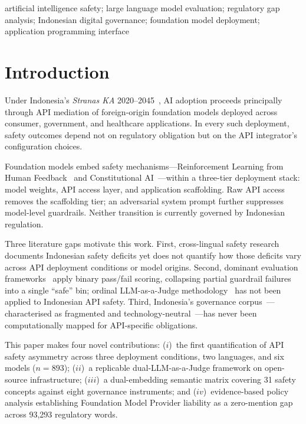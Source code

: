 \documentclass[conference]{IEEEtran}
\begin{document}
\begin{IEEEkeywords}
artificial intelligence safety; large language model evaluation; regulatory gap
analysis; Indonesian digital governance; foundation model deployment; application
programming interface
\end{IEEEkeywords}

\section{Introduction}

Under Indonesia’s \textit{Stranas KA} 2020--2045~\cite{b9}, AI adoption proceeds principally through API mediation of foreign-origin foundation models deployed across consumer, government, and healthcare applications. In every such deployment, safety outcomes depend not on regulatory obligation but on the API integrator’s configuration choices.

Foundation models embed safety mechanisms—Reinforcement Learning from Human Feedback~\cite{b25} and Constitutional AI~\cite{b26}—within a three-tier deployment stack: model weights, API access layer, and application scaffolding. Raw API access removes the scaffolding tier; an adversarial system prompt further suppresses model-level guardrails. Neither transition is currently governed by Indonesian regulation.

Three literature gaps motivate this work. First, cross-lingual safety research~\cite{b5,b6} documents Indonesian safety deficits yet does not quantify how those deficits vary across API deployment conditions or model origins. Second, dominant evaluation frameworks~\cite{b3,b18} apply binary pass/fail scoring, collapsing partial guardrail failures into a single ``safe'' bin; ordinal LLM-as-a-Judge methodology~\cite{b21,b22} has not been applied to Indonesian API safety. Third, Indonesia’s governance corpus~\cite{b9,b10,b11,b12,b13,b14,b15,b16}—characterised as fragmented and technology-neutral~\cite{b2,b8}—has never been computationally mapped for API-specific obligations.

This paper makes four novel contributions: ($i$)~the first quantification of API safety asymmetry across three deployment conditions, two languages, and six models ($n\!=\!893$); ($ii$)~a replicable dual-LLM-as-a-Judge framework on open-source infrastructure; ($iii$)~a dual-embedding semantic matrix covering 31 safety concepts against eight governance instruments; and ($iv$)~evidence-based policy analysis establishing Foundation Model Provider liability as a zero-mention gap across 93,293 regulatory words.
\end{document}
